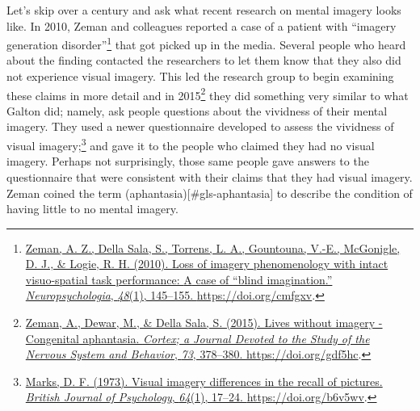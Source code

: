 \documentclass[
  oneside,
  12pt]{crumpbook}
\begin{document}
Let's skip over a century and ask what recent research on mental imagery looks like. In 2010, Zeman and colleagues reported a case of a patient with ``imagery generation disorder''\footnote{\protect\hyperlink{ref-zemanLossImageryPhenomenology2010}{Zeman, A. Z., Della Sala, S., Torrens, L. A., Gountouna, V.-E., McGonigle, D. J., \& Logie, R. H. (2010). Loss of imagery phenomenology with intact visuo-spatial task performance: {A} case of {``blind imagination.''} \emph{Neuropsychologia}, \emph{48}(1), 145--155. \url{https://doi.org/cmfgxv}}.} that got picked up in the media. Several people who heard about the finding contacted the researchers to let them know that they also did not experience visual imagery. This led the research group to begin examining these claims in more detail and in 2015\footnote{\protect\hyperlink{ref-zemanLivesImageryCongenital2015}{Zeman, A., Dewar, M., \& Della Sala, S. (2015). Lives without imagery - {Congenital} aphantasia. \emph{Cortex; a Journal Devoted to the Study of the Nervous System and Behavior}, \emph{73}, 378--380. \url{https://doi.org/gdf5hc}}.} they did something very similar to what Galton did; namely, ask people questions about the vividness of their mental imagery. They used a newer questionnaire developed to assess the vividness of visual imagery;\footnote{\protect\hyperlink{ref-marksVisualImageryDifferences1973}{Marks, D. F. (1973). Visual imagery differences in the recall of pictures. \emph{British Journal of Psychology}, \emph{64}(1), 17--24. \url{https://doi.org/b6v5wv}}.} and gave it to the people who claimed they had no visual imagery. Perhaps not surprisingly, those same people gave answers to the questionnaire that were consistent with their claims that they had visual imagery. Zeman coined the term (aphantasia){[}\#gls-aphantasia{]} to describe the condition of having little to no mental imagery.
\end{document}
